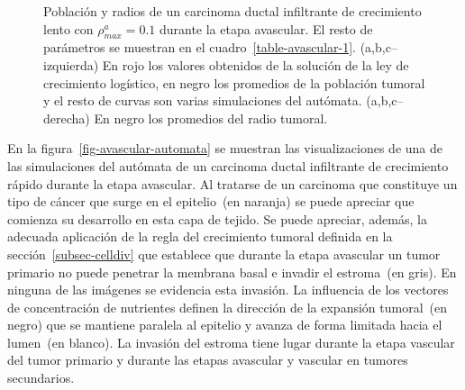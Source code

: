 \begin{figure}[p]
\begin{center}
\end{center}\vspace*{-0.6cm}
\caption[Poblaci\'on y radios de un carcinoma ductal infiltrante de crecimiento lento con $\rho_{max}^a=0$.$1$ durante la etapa avascular]{Poblaci\'on y radios de un carcinoma ductal infiltrante de crecimiento lento con $\rho_{max}^a=0$.$1$ durante la etapa avascular. El resto de par\'ametros se muestran en el cuadro~\ref{table-avascular-1}. (a,b,c--izquierda) En rojo los valores obtenidos de la soluci\'on de la ley de crecimiento log\'istico, en negro los promedios de la poblaci\'on tumoral y el resto de curvas son varias simulaciones del aut\'omata. (a,b,c--derecha) En negro los promedios del radio tumoral.}
\label{graph-avascular-simulations-1}
\end{figure}

En la figura~\ref{fig-avascular-automata} se muestran las visualizaciones de una de las simulaciones del aut\'omata de un carcinoma ductal infiltrante de crecimiento r\'apido durante la etapa avascular. Al tratarse de un carcinoma que constituye un tipo de c\'ancer que surge en el epitelio~(en naranja) se puede apreciar que comienza su desarrollo en esta capa de tejido. Se puede apreciar, adem\'as, la adecuada aplicaci\'on de la regla del crecimiento tumoral definida en la secci\'on~\ref{subsec-celldiv} que establece que durante la etapa avascular un tumor primario no puede penetrar la membrana basal e invadir el estroma~(en gris). En ninguna de las im\'agenes se evidencia esta invasi\'on. La influencia de los vectores de concentraci\'on de nutrientes definen la direcci\'on de la expansi\'on tumoral~(en negro) que se mantiene paralela al epitelio y avanza de forma limitada hacia el lumen~(en blanco). La invasi\'on del estroma tiene lugar durante la etapa vascular del tumor primario y durante las etapas avascular y vascular en tumores secundarios. 
